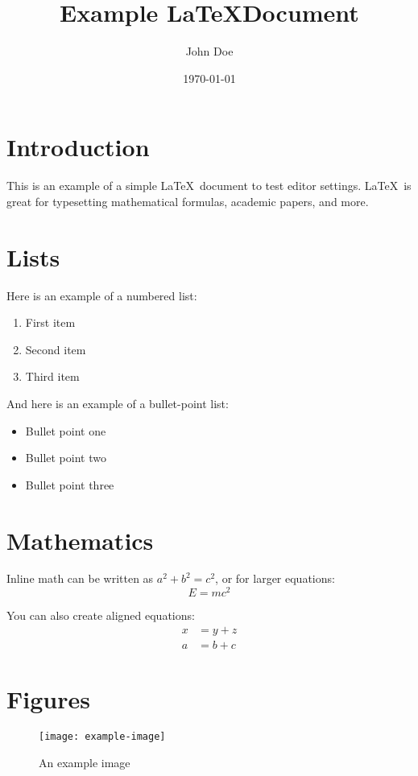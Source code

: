 \documentclass{article}
\title{Example \LaTeX Document}
\author{John Doe}
\date{\today}
\begin{document}
\maketitle

\section{Introduction}
This is an example of a simple \LaTeX\ document to test editor settings. \LaTeX\ is great for typesetting mathematical formulas, academic papers, and more.

\section{Lists}
Here is an example of a numbered list:
\begin{enumerate}
    \item First item
    \item Second item
    \item Third item
\end{enumerate}

And here is an example of a bullet-point list:
\begin{itemize}
    \item Bullet point one
    \item Bullet point two
    \item Bullet point three
\end{itemize}

\section{Mathematics}
Inline math can be written as $a^2 + b^2 = c^2$, or for larger equations:
\begin{equation}
    E = mc^2
\end{equation}

You can also create aligned equations:
\begin{align}
    x &= y + z \\
    a &= b + c
\end{align}

\section{Figures}
\begin{figure}[h]
    \centering
    \texttt{[image: example-image]}
    \caption{An example image}
    \label{fig:example}
\end{figure}
\end{document}

